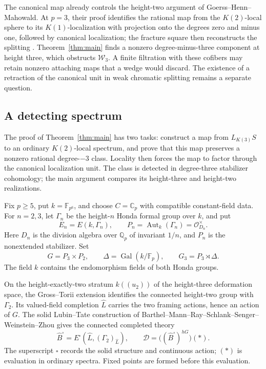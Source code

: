 \documentclass[11pt]{article}
\numberwithin{equation}{section}
\theoremstyle{definition}
\theoremstyle{remark}
\begin{document}
The canonical map already controls the height-two argument of
Goerss--Henn--Mahowald. At \(p=3\), their proof identifies the rational
map from the \(K(2)\)-local sphere to its \(K(1)\)-localization with
projection onto the degrees zero and minus one, followed by canonical
localization; the fracture square then reconstructs the splitting
\cite[proof of Theorem~5.11, p.~1288]{GHM2014}.
Theorem~\ref{thm:main} finds a nonzero degree-minus-three component at
height three, which obstructs \(\mathcal W_3\). A finite filtration
with these cofibers may retain nonzero attaching maps that a wedge
would discard. The existence of a retraction of the canonical unit
in weak chromatic splitting remains a separate question.

\subsection{A detecting spectrum}

The proof of Theorem~\ref{thm:main} has two tasks: construct a map
from \(L_{K(3)}S\) to an ordinary \(K(2)\)-local spectrum, and prove
that this map preserves a nonzero rational degree-\(-3\) class. Locality
then forces the map to factor through the canonical localization unit.
The class is detected in degree-three stabilizer cohomology; the main
argument compares its height-three and height-two realizations.

Fix \(p\geq5\), put \(k=\mathbb F_{p^6}\), and choose \(C=\mathbb C_p\) with
compatible constant-field data. For \(n=2,3\), let \(\Gamma_n\) be the
height-\(n\) Honda formal group over \(k\), and put
\[
 E_n=E(k,\Gamma_n),\qquad
 P_n=\operatorname{Aut}_k(\Gamma_n)=\mathcal O_{D_n}^{\times}.
\]
Here \(D_n\) is the division algebra over \(\mathbb Q_p\) of invariant
\(1/n\), and \(P_n\) is the nonextended stabilizer. Set
\[
 G=P_3\times P_2,\qquad
 \Delta=\operatorname{Gal}(k/\mathbb F_p),\qquad G_3=P_3\rtimes\Delta.
\]
The field \(k\) contains the endomorphism fields of both Honda groups.

On the height-exactly-two stratum \(k((u_2))\) of the height-three
deformation space, the Gross--Torii extension identifies the connected
height-two group with \(\Gamma_2\). Its valued-field completion
\(\widehat L\) carries the two framing actions, hence an action of
\(G\). The solid Lubin--Tate construction of
Barthel--Mann--Ray--Schlank--Senger--Weinstein--Zhou \cite{BMR2026}
gives the connected completed theory
\[
 \widehat B^\square=E^\square(\widehat L,(\Gamma_2)_{\widehat L}),
 \qquad \mathcal D=\bigl((\widehat B^\square)^{hG}\bigr)(*).
\]
The superscript \(\square\) records the solid structure and continuous
action; \((*)\) is evaluation in ordinary spectra. Fixed points are
formed before this evaluation.
\end{document}
